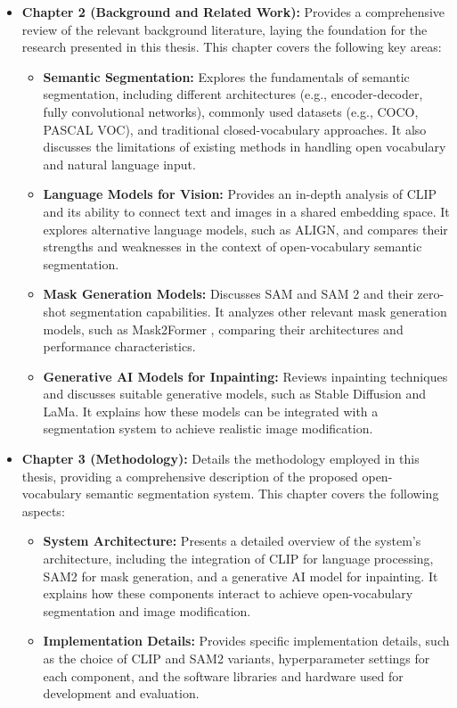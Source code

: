 \begin{itemize}
\item \textbf{Chapter 2 (Background and Related Work):} Provides a comprehensive review of the relevant background literature, laying the foundation for the research presented in this thesis. This chapter covers the following key areas:
\begin{itemize}
\item \textbf{Semantic Segmentation:} Explores the fundamentals of semantic segmentation, including different architectures (e.g., encoder-decoder, fully convolutional networks), commonly used datasets (e.g., COCO, PASCAL VOC), and traditional closed-vocabulary approaches. It also discusses the limitations of existing methods in handling open vocabulary and natural language input.
\item \textbf{Language Models for Vision:} Provides an in-depth analysis of CLIP \cite{radford2021learning} and its ability to connect text and images in a shared embedding space. It explores alternative language models, such as ALIGN, and compares their strengths and weaknesses in the context of open-vocabulary semantic segmentation.
\item \textbf{Mask Generation Models:} Discusses SAM \cite{kirillov2023segment} and SAM 2 \cite{ravi2024sam2} and their zero-shot segmentation capabilities. It analyzes other relevant mask generation models, such as Mask2Former \cite{cheng2022mask2former}, comparing their architectures and performance characteristics.
\item \textbf{Generative AI Models for Inpainting:} Reviews inpainting techniques and discusses suitable generative models, such as Stable Diffusion \cite{rombach2022high} and LaMa. It explains how these models can be integrated with a segmentation system to achieve realistic image modification.
\end{itemize}

\item \textbf{Chapter 3 (Methodology):} Details the methodology employed in this thesis, providing a comprehensive description of the proposed open-vocabulary semantic segmentation system. This chapter covers the following aspects:
\begin{itemize}
\item \textbf{System Architecture:} Presents a detailed overview of the system's architecture, including the integration of CLIP for language processing, SAM2 for mask generation, and a generative AI model for inpainting. It explains how these components interact to achieve open-vocabulary segmentation and image modification.
\item \textbf{Implementation Details:} Provides specific implementation details, such as the choice of CLIP and SAM2 variants, hyperparameter settings for each component, and the software libraries and hardware used for development and evaluation.
\end{itemize}


\end{itemize}
